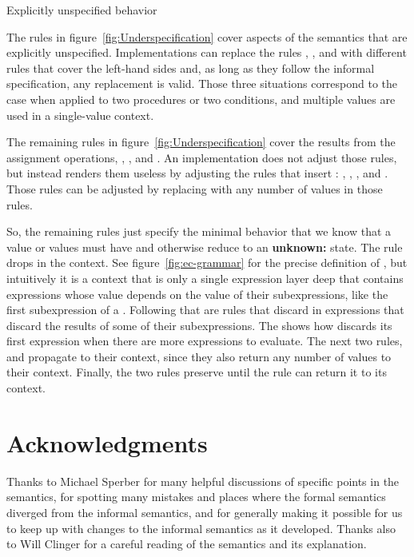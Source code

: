 \beginfig
\begin{center}

\end{center}
\caption{Explicitly unspecified behavior}\label{fig:Underspecification}
\endfig

The rules in figure~\ref{fig:Underspecification} cover aspects of the
semantics that are explicitly unspecified. Implementations can replace
the rules , ,  and with different rules that cover the left-hand sides and, as long as they follow the informal specification, any replacement is valid. Those three situations correspond to the case when  applied to two procedures or
two conditions, and multiple values are used in a single-value context.

The remaining rules in figure~\ref{fig:Underspecification} cover the results from the assignment operations, , , and . An implementation does not adjust those rules, but instead renders them useless by adjusting the rules that insert : , , , and . Those rules can be adjusted by replacing  with any number of values in those rules.

So, the remaining rules just specify the minimal behavior that we know that a value or values must have and otherwise reduce to an \textbf{unknown:} state. The rule  drops  in the  context. See figure~\ref{fig:ec-grammar} for the precise definition of , but intuitively it is a context that is only a single expression layer deep that contains expressions whose value depends on the value of their subexpressions, like the first subexpression of a . Following that are rules that discard  in expressions that discard the results of some of their subexpressions. The  shows how  discards its first expression when there are more expressions to evaluate. The next two rules,  and  propagate  to their context, since they also return any number of values to their context. Finally, the two  rules preserve  until the rule  can return it to its context.

\section*{Acknowledgments}

Thanks to Michael Sperber for many helpful discussions of specific points in the semantics, for spotting many mistakes and places where the formal semantics diverged from the informal semantics, and for generally making it possible for us to keep up with changes to the informal semantics as it developed. Thanks also to Will Clinger for a careful reading of the semantics and its explanation.

